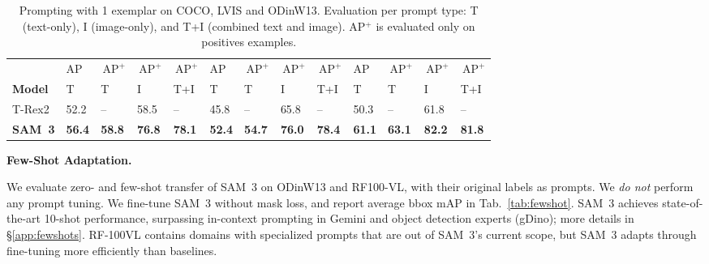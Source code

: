 \documentclass[]{fairmeta}
\newcommand{\model}{SAM~3\xspace}
\renewcommand{\paragraph}[1]{%
	\noindent\textbf{#1.}\noindent\xspace%
}
\begin{document}
\begin{table}[t]
\begin{minipage}[b]{0.66\textwidth}
{\begin{tabular}{y{30}*{12}{x{16}}}
						& 
						AP & \hspace*{-2pt}$\,\textrm{AP}^{+}$ & \hspace*{-2pt}$\,\textrm{AP}^{+}$ & \hspace*{-2pt}$\,\textrm{AP}^{+}$ &  AP & \hspace*{-2pt}$\,\textrm{AP}^{+}$ & \hspace*{-2pt}$\,\textrm{AP}^{+}$ & \hspace*{-2pt}$\,\textrm{AP}^{+}$ &                 AP & \hspace*{-2pt}$\,\textrm{AP}^{+}$ & \hspace*{-2pt}$\,\textrm{AP}^{+}$ & \hspace*{-2pt}$\,\textrm{AP}^{+}$
						\\ \textbf{Model}& T & T & I & \hspace*{-2pt}T+I     & T & T & I & \hspace*{-2pt}T+I  & T & T & I & \hspace*{-2pt}T+I \\
						\midrule
						T-Rex2 & 
						52.2 & {--} & 58.5 & {--} & 45.8 & {--} & 65.8 & {--} & 50.3 & {--} & 61.8 & {--} \\
						\textbf{\model} &
                        \textbf{56.4} & \textbf{58.8} & \textbf{76.8} & \textbf{78.1} & \textbf{52.4} & \textbf{54.7} & \textbf{76.0} & \textbf{78.4} & \textbf{61.1} & \textbf{63.1} & \textbf{82.2} & \textbf{81.8} \\
					\end{tabular}
					\setlength{\tabcolsep}{\oldtabcolsep}
			}
			
					\vspace{-3pt}
		\caption{Prompting with 1 exemplar on COCO, LVIS and ODinW13. 
			Evaluation per prompt type: T (text-only), I (image-only), and T+I (combined text and image). AP$^{+}$ is evaluated only on positives examples.}
		\label{tab:coco_odin_performance}
	\end{minipage}
\end{table}


\paragraph{Few-Shot Adaptation}  
We evaluate zero- and few-shot transfer of \model on ODinW13 and RF100-VL, with their original labels as prompts. We \textit{do not} perform any prompt tuning. 
We fine-tune \model without mask loss, and report average bbox mAP in Tab.~\ref{tab:fewshot}. \model achieves state-of-the-art 10-shot performance, surpassing in-context prompting in Gemini and object detection experts (gDino); more details in \S\ref{app:fewshots}. RF-100VL contains domains with specialized prompts that are out of \model's current scope, but \model adapts through fine-tuning more efficiently than baselines.
\end{document}
